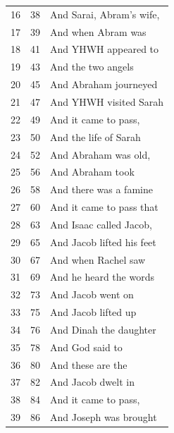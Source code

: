 \documentclass{article}
\newlength{\minipageheight}
\newlength{\minipagewidth}
\begin{document}
\begin{minipage}[l][\minipageheight][t]{\minipagewidth}
\begin{longtable}{ccl}
        16          & 38           & And Sarai, Abram's wife,         \\
        17          & 39           & And when Abram was               \\
        18          & 41           & And YHWH appeared to             \\
        19          & 43           & And the two angels               \\
        20          & 45           & And Abraham journeyed            \\
        21          & 47           & And YHWH visited Sarah           \\
        22          & 49           & And it came to pass,             \\
        23          & 50           & And the life of Sarah            \\
        24          & 52           & And Abraham was old,             \\
        25          & 56           & And Abraham took                 \\
        26          & 58           & And there was a famine           \\
        27          & 60           & And it came to pass that         \\
        28          & 63           & And Isaac called Jacob,          \\
        29          & 65           & And Jacob lifted his feet        \\
        30          & 67           & And when Rachel saw              \\
        31          & 69           & And he heard the words           \\
        32          & 73           & And Jacob went on                \\
        33          & 75           & And Jacob lifted up              \\
        34          & 76           & And Dinah the daughter           \\
        35          & 78           & And God said to                  \\
        36          & 80           & And these are the                \\
        37          & 82           & And Jacob dwelt in               \\
        38          & 84           & And it came to pass,             \\
        39          & 86           & And Joseph was brought           \\

\end{longtable}
\end{minipage}
\end{document}
